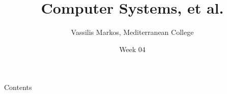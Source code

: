 \documentclass[aspectratio=169, 12pt]{beamer}
\title{Computer Systems, et al.}
\date{Week 04}
\author{Vassilis Markos, Mediterranean College}
\newcommand{\ohref}[1]{\href{#1}{\texttt{#1}}}
\begin{document}
	\begin{frame}
		\titlepage
	\end{frame}

	\begin{frame}{Contents}
		\tableofcontents
	\end{frame}

%	
%	
%
	
\end{document}
